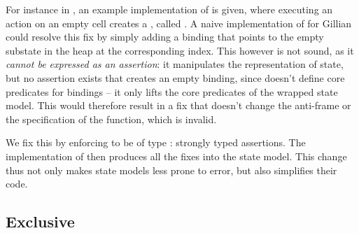 For instance in \cite{sacha-phd}, an example implementation of \PMap{} is given, where executing an action on an empty cell creates a \Miss{}, called . A naive implementation of \PMap{} for Gillian could resolve this fix by simply adding a binding that points to the empty substate in the heap at the corresponding index. This however is not sound, as it \emph{cannot be expressed as an assertion}: it manipulates the representation of state, but no assertion exists that creates an empty binding, since \PMap{} doesn't define core predicates for bindings -- it only lifts the core predicates of the wrapped state model. This would therefore result in a fix that doesn't change the anti-frame or the specification of the function, which is invalid.

We fix this by enforcing  to be of type : strongly typed assertions. The implementation of  then produces all the fixes into the state model. This change thus not only makes state models less prone to error, but also simplifies their code.

\subsection{Exclusive} \label{subsec:ex-impl}

